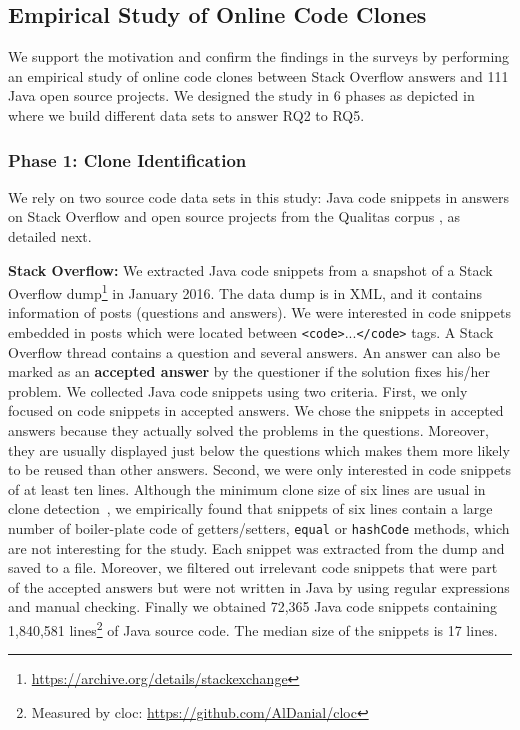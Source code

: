 \documentclass[10pt,journal,compsoc]{IEEEtran}
\begin{document}
\subsection{Empirical Study of Online Code Clones}
We support the motivation and confirm the findings in the surveys by performing
an empirical study of online code clones between Stack Overflow
answers and 111 Java open source projects.
We designed the study in 6 phases as depicted in  where
we build different data sets to answer RQ2 to RQ5. 

\subsubsection{Phase 1: Clone Identification}

We rely on two source code data sets in this study: Java code snippets in answers
on Stack Overflow and open source projects from the Qualitas corpus
\cite{QualitasCorpus}, as detailed next.

\textbf{Stack Overflow:} We extracted Java code snippets from a snapshot of a
Stack Overflow dump\footnote{\url{https://archive.org/details/stackexchange}} in
January 2016. %
The data dump is in XML, and it contains information of posts (questions and
answers). We were interested in code snippets embedded in posts which were
located between {\small\texttt{<code>}...\texttt{</code>}} tags. A Stack
Overflow thread contains a question and several answers. An answer can also be
marked as an \textbf{accepted answer} by the questioner if the solution fixes
his/her problem. We collected Java code snippets using two criteria. First, we
only focused on code snippets in accepted answers. We chose the snippets in
accepted answers because they actually solved the problems in the questions.
Moreover, they are usually displayed just below the questions which makes them
more likely to be reused than other answers. Second, we were only interested in
code snippets of at least ten lines. Although the minimum clone size of six
lines are usual in clone detection~\cite{Bellon2007,Wang2013,Koschke2006}, we
empirically found that snippets of six lines contain a large number of
boiler-plate code of getters/setters, \texttt{equal} or \texttt{hashCode}
methods, which are not interesting for the study. Each snippet was extracted
from the dump and saved to a file. Moreover, we filtered out irrelevant code
snippets that were part of the accepted answers but were not written in Java by
using regular expressions and manual checking.
Finally we obtained 72,365 Java code snippets containing 1,840,581
lines\footnote{Measured by cloc: \url{https://github.com/AlDanial/cloc}} of Java
source code. The median size of the snippets is 17 lines.
\end{document}
